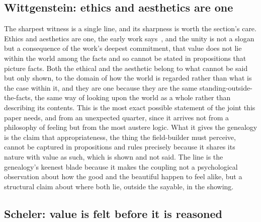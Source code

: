\subsection{Wittgenstein: ethics and aesthetics are one}
\label{p22:sub:gen-wittgenstein}

The sharpest witness is a single line, and its sharpness is worth the section's care. Ethics and aesthetics are one, the early work says~\parencite{wittgenstein_tractatus}, and the unity is not a slogan but a consequence of the work's deepest commitment, that value does not lie within the world among the facts and so cannot be stated in propositions that picture facts. Both the ethical and the aesthetic belong to what cannot be said but only shown, to the domain of how the world is regarded rather than what is the case within it, and they are one because they are the same standing-outside-the-facts, the same way of looking upon the world as a whole rather than describing its contents. This is the most exact possible statement of the joint this paper needs, and from an unexpected quarter, since it arrives not from a philosophy of feeling but from the most austere logic. What it gives the genealogy is the claim that appropriateness, the thing the field-builder must perceive, cannot be captured in propositions and rules precisely because it shares its nature with value as such, which is shown and not said. The line is the genealogy's keenest blade because it makes the coupling not a psychological observation about how the good and the beautiful happen to feel alike, but a structural claim about where both lie, outside the sayable, in the showing.

\subsection{Scheler: value is felt before it is reasoned}
\label{p22:sub:gen-scheler}

